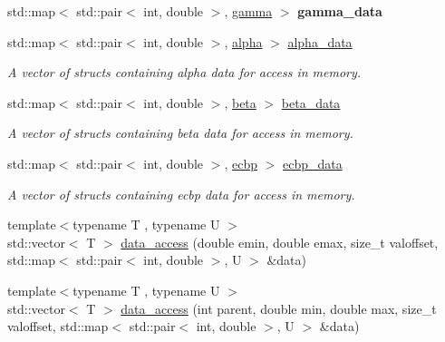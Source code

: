 \begin{DoxyCompactItemize}
\item 
\mbox{\label{namespacepyne_a590557e517e261616148c1643e72ddb2}} 
std\+::map$<$ std\+::pair$<$ int, double $>$, \hyperlink{structpyne_1_1gamma}{gamma} $>$ {\bfseries gamma\+\_\+data}
\item 
\mbox{\label{namespacepyne_a535b6ec192f55087092c07ee478bc11d}} 
std\+::map$<$ std\+::pair$<$ int, double $>$, \hyperlink{structpyne_1_1alpha}{alpha} $>$ \hyperlink{namespacepyne_a535b6ec192f55087092c07ee478bc11d}{alpha\+\_\+data}
\begin{DoxyCompactList}\small\item\em A vector of structs containing alpha data for access in memory. \end{DoxyCompactList}\item 
\mbox{\label{namespacepyne_a5a5d547521d918978adccc01a8cdd10c}} 
std\+::map$<$ std\+::pair$<$ int, double $>$, \hyperlink{structpyne_1_1beta}{beta} $>$ \hyperlink{namespacepyne_a5a5d547521d918978adccc01a8cdd10c}{beta\+\_\+data}
\begin{DoxyCompactList}\small\item\em A vector of structs containing beta data for access in memory. \end{DoxyCompactList}\item 
\mbox{\label{namespacepyne_a43b4b8a8b73a5e966a55e14a270e98bf}} 
std\+::map$<$ std\+::pair$<$ int, double $>$, \hyperlink{structpyne_1_1ecbp}{ecbp} $>$ \hyperlink{namespacepyne_a43b4b8a8b73a5e966a55e14a270e98bf}{ecbp\+\_\+data}
\begin{DoxyCompactList}\small\item\em A vector of structs containing ecbp data for access in memory. \end{DoxyCompactList}\item 
{\footnotesize template$<$typename T , typename U $>$ }\\std\+::vector$<$ T $>$ \hyperlink{namespacepyne_aa125de2afb079df43b2db1029792bf44}{data\+\_\+access} (double emin, double emax, size\+\_\+t valoffset, std\+::map$<$ std\+::pair$<$ int, double $>$, U $>$ \&data)
\item 
{\footnotesize template$<$typename T , typename U $>$ }\\std\+::vector$<$ T $>$ \hyperlink{namespacepyne_a1055e5c9a261d8f8490f8ebf1172e95d}{data\+\_\+access} (int parent, double min, double max, size\+\_\+t valoffset, std\+::map$<$ std\+::pair$<$ int, double $>$, U $>$ \&data)

\end{DoxyCompactItemize}
